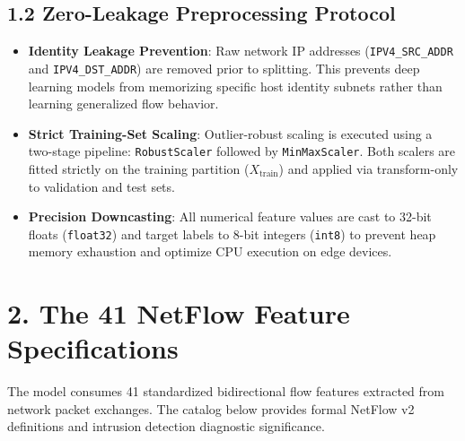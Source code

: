 \documentclass[10pt,a4paper]{article}
\begin{document}
\subsection*{1.2 Zero-Leakage Preprocessing Protocol}
\begin{itemize}
    \setlength\itemsep{0em}
    \item \textbf{Identity Leakage Prevention}: Raw network IP addresses (\texttt{IPV4\_SRC\_ADDR} and \texttt{IPV4\_DST\_ADDR}) are removed prior to splitting. This prevents deep learning models from memorizing specific host identity subnets rather than learning generalized flow behavior.
    \item \textbf{Strict Training-Set Scaling}: Outlier-robust scaling is executed using a two-stage pipeline: \texttt{RobustScaler} followed by \texttt{MinMaxScaler}. Both scalers are fitted strictly on the training partition ($X_{\text{train}}$) and applied via transform-only to validation and test sets.
    \item \textbf{Precision Downcasting}: All numerical feature values are cast to 32-bit floats (\texttt{float32}) and target labels to 8-bit integers (\texttt{int8}) to prevent heap memory exhaustion and optimize CPU execution on edge devices.
\end{itemize}

\section*{2. The 41 NetFlow Feature Specifications}

The model consumes 41 standardized bidirectional flow features extracted from network packet exchanges. The catalog below provides formal NetFlow v2 definitions and intrusion detection diagnostic significance.
\end{document}
